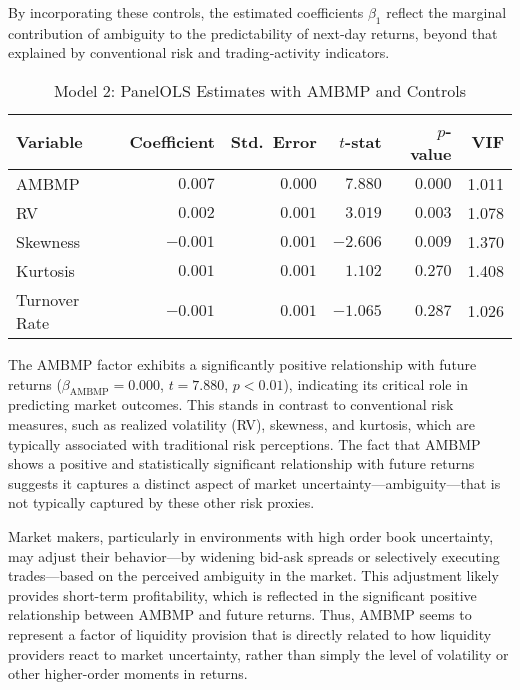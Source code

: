 \documentclass[preprint,12pt,authoryear]{elsarticle}
\begin{document}
By incorporating these controls, the estimated coefficients \(\beta_1\) reflect the marginal contribution of ambiguity to the predictability of next‐day returns, beyond that explained by conventional risk and trading‐activity indicators.  

\begin{table}[h!]
  \centering
  \caption{Model 2: PanelOLS Estimates with AMBMP and Controls}
  \label{tab:panelols_model2}
  \begin{tabular}{lrrrrr}
    \toprule
    Variable         & Coefficient & Std.\ Error & \(t\)-stat & \(p\)-value & VIF    \\
    \midrule
    AMBMP            & \(0.007\)   & \(0.000\)   & \(7.880\)   & \(0.000\)   & 1.011  \\
    RV               & \(0.002\)   & \(0.001\)   & \(3.019\)   & \(0.003\)   & 1.078  \\
    Skewness         & \(-0.001\)  & \(0.001\)   & \(-2.606\)  & \(0.009\)   & 1.370  \\
    Kurtosis         & \(0.001\)   & \(0.001\)   & \(1.102\)   & \(0.270\)   & 1.408  \\
    Turnover Rate    & \(-0.001\)  & \(0.001\)   & \(-1.065\)  & \(0.287\)   & 1.026  \\
    \bottomrule
  \end{tabular}
\end{table}

The AMBMP factor exhibits a significantly positive relationship with future returns (\(\beta_{\mathrm{AMBMP}} = 0.000\), \(t = 7.880\), \(p < 0.01\)), indicating its critical role in predicting market outcomes. This stands in contrast to conventional risk measures, such as realized volatility (RV), skewness, and kurtosis, which are typically associated with traditional risk perceptions. The fact that AMBMP shows a positive and statistically significant relationship with future returns suggests it captures a distinct aspect of market uncertainty—ambiguity—that is not typically captured by these other risk proxies. 

Market makers, particularly in environments with high order book uncertainty, may adjust their behavior—by widening bid-ask spreads or selectively executing trades—based on the perceived ambiguity in the market. This adjustment likely provides short-term profitability, which is reflected in the significant positive relationship between AMBMP and future returns. Thus, AMBMP seems to represent a factor of liquidity provision that is directly related to how liquidity providers react to market uncertainty, rather than simply the level of volatility or other higher-order moments in returns.
\end{document}

